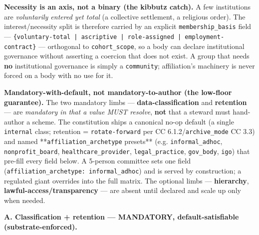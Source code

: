 \documentclass[11pt]{article}
\begin{document}
\textbf{Necessity is an axis, not a binary (the kibbutz catch).} A few institutions are \textit{voluntarily entered yet total} (a collective settlement, a religious order). The interest/necessity split is therefore carried by an explicit \texttt{membership\_basis} field — \texttt{\{voluntary-total | ascriptive | role-assigned | employment-contract\}} — orthogonal to \texttt{cohort\_scope}, so a body can declare institutional governance without asserting a coercion that does not exist. A group that needs \textbf{no} institutional governance is simply a \texttt{community}; affiliation's machinery is never forced on a body with no use for it.


\textbf{Mandatory-with-default, not mandatory-to-author (the low-floor guarantee).} The two mandatory limbs — \textbf{data-classification} and \textbf{retention} — are \textit{mandatory in that a value MUST resolve}, \textbf{not} that a steward must hand-author a scheme. The constitution ships a canonical no-op default (a single \texttt{internal} class; retention = \texttt{rotate-forward} per CC 6.1.2/\texttt{archive\_mode} CC 3.3) and named **\texttt{affiliation\_archetype} presets** (e.g. \texttt{informal\_adhoc}, \texttt{nonprofit\_board}, \texttt{healthcare\_provider}, \texttt{legal\_practice}, \texttt{gov\_body}, \texttt{igo}) that pre-fill every field below. A 5-person committee sets one field (\texttt{affiliation\_archetype: informal\_adhoc}) and is served by construction; a regulated giant overrides into the full matrix. The optional limbs — \textbf{hierarchy}, \textbf{lawful-access/transparency} — are absent until declared and scale up only when needed.


\textbf{A. Classification + retention — MANDATORY, default-satisfiable (substrate-enforced).}
\end{document}
